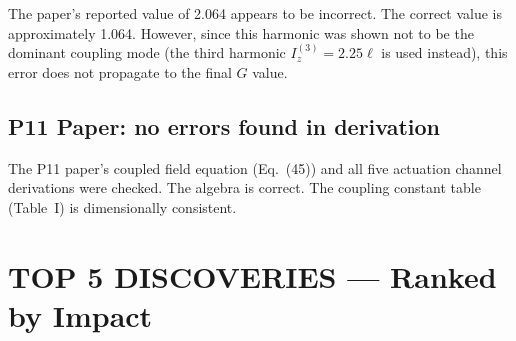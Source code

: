 \documentclass[11pt,twocolumn]{article}
\begin{document}
The paper's reported value of 2.064 appears to be incorrect. The
correct value is approximately 1.064. However, since this harmonic
was shown not to be the dominant coupling mode (the third harmonic
$I_z^{(3)} = 2.25\ell$ is used instead), this error does not
propagate to the final $G$ value.

\subsection{P11 Paper: no errors found in derivation}

The P11 paper's coupled field equation (Eq.~(45)) and all five
actuation channel derivations were checked. The algebra is correct.
The coupling constant table (Table~I) is dimensionally consistent.


\section{TOP 5 DISCOVERIES --- Ranked by Impact}
\label{sec:top5}
\end{document}
